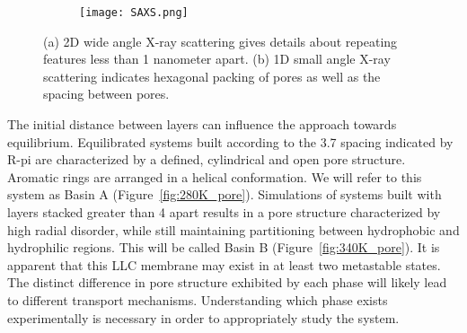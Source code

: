 \begin{figure}
	\centering
	\begin{subfigure}[t]{0.47\linewidth}
		\centering
		\caption{}\label{fig:WAXS}
	\end{subfigure}
	\begin{subfigure}[t]{0.43\linewidth}
		\centering
		\texttt{[image: SAXS.png]}
		\caption{}\label{fig:SAXS}
	\end{subfigure}
	\caption{(a) 2D wide angle X-ray scattering gives details about repeating features less than 1 nanometer apart. (b) 1D small angle X-ray scattering indicates hexagonal packing of pores as well as the spacing between pores.}\label{fig:SWAXS}
\end{figure}

The initial distance between layers can influence the approach towards
equilibrium. Equilibrated systems built according to the 3.7 \angstrom 
spacing indicated by R-pi are characterized by a defined, cylindrical and
open pore structure. Aromatic rings are arranged in a helical conformation.
We will refer to this system as Basin A (Figure~\ref{fig:280K_pore}). Simulations
of systems built with layers stacked greater than 4 \angstrom apart results in a pore
structure characterized by high radial disorder, while still maintaining 
partitioning between hydrophobic and hydrophilic regions. This will be 
called Basin B (Figure~\ref{fig:340K_pore}). It is apparent that this LLC membrane
may exist in at least two metastable states. The distinct difference in 
pore structure exhibited by each phase will likely lead to different transport
mechanisms. Understanding which phase exists experimentally is necessary in 
order to appropriately study the system.

